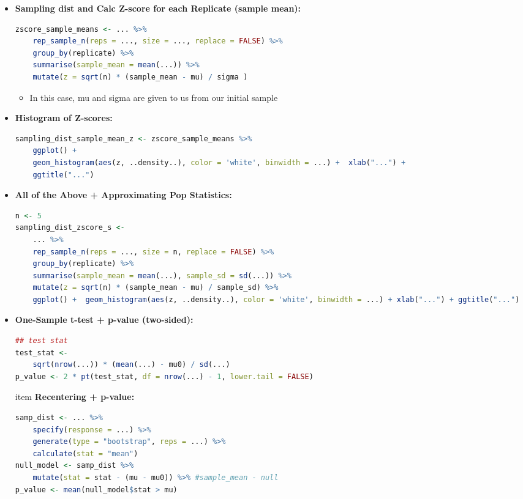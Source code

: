 \documentclass[8pt,landscape,a4paper, fleqn, dvipsnames]{extarticle}
\begin{document}
\begin{multicols*}{4}
\begin{itemize}
\begin{lstlisting}[language = R]
        \end{lstlisting}
    \item \textbf{Sampling dist and Calc Z-score for each Replicate (sample mean):}
        \begin{lstlisting}[language = R]
zscore_sample_means <- ... %>% 
    rep_sample_n(reps = ..., size = ..., replace = FALSE) %>% 
    group_by(replicate) %>% 
    summarise(sample_mean = mean(...)) %>% 
    mutate(z = sqrt(n) * (sample_mean - mu) / sigma )
        \end{lstlisting}
        \begin{itemize}
            \item In this case, mu and sigma are given to us from our initial sample
        \end{itemize}
    \item \textbf{Histogram of Z-scores:}
        \begin{lstlisting}[language = R]
sampling_dist_sample_mean_z <- zscore_sample_means %>% 
    ggplot() + 
    geom_histogram(aes(z, ..density..), color = 'white', binwidth = ...) +  xlab("...") +
    ggtitle("...")
        \end{lstlisting}
    \item \textbf{All of the Above + Approximating Pop Statistics:}
        \begin{lstlisting}[language = R]
n <- 5
sampling_dist_zscore_s <-
    ... %>% 
    rep_sample_n(reps = ..., size = n, replace = FALSE) %>% 
    group_by(replicate) %>% 
    summarise(sample_mean = mean(...), sample_sd = sd(...)) %>% 
    mutate(z = sqrt(n) * (sample_mean - mu) / sample_sd) %>% 
    ggplot() +  geom_histogram(aes(z, ..density..), color = 'white', binwidth = ...) + xlab("...") + ggtitle("...")
        \end{lstlisting}
    \item \textbf{One-Sample t-test + p-value (two-sided):}
        \begin{lstlisting}[language = R]
## test stat
test_stat <- 
    sqrt(nrow(...)) * (mean(...) - mu0) / sd(...)
p_value <- 2 * pt(test_stat, df = nrow(...) - 1, lower.tail = FALSE)
        \end{lstlisting}
        item \textbf{Recentering + p-value:}
        \begin{lstlisting}[language = R]
samp_dist <- ... %>%
    specify(response = ...) %>%
    generate(type = "bootstrap", reps = ...) %>%
    calculate(stat = "mean")
null_model <- samp_dist %>%
    mutate(stat = stat - (mu - mu0)) %>% #sample_mean - null
p_value <- mean(null_model$stat > mu)

\end{lstlisting}
\end{itemize}
\end{multicols*}
\end{document}
